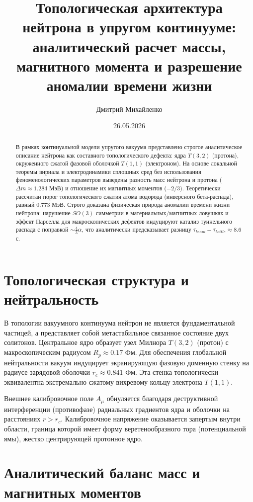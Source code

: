 \documentclass[12pt,a4paper]{article}
\title{Топологическая архитектура нейтрона в упругом континууме: аналитический расчет массы, магнитного момента и разрешение аномалии времени жизни}
\author{Дмитрий Михайленко}
\date{26.05.2026}
\begin{document}
\maketitle

\begin{abstract}
В рамках континуальной модели упругого вакуума представлено строгое аналитическое описание нейтрона как составного топологического дефекта: ядра $T(3,2)$ (протона), окруженного сжатой фазовой оболочкой $T(1,1)$ (электроном). На основе локальной теоремы вириала и электродинамики сплошных сред без использования феноменологических параметров выведены разность масс нейтрона и протона ($\Delta m \approx 1.284$ МэВ) и отношение их магнитных моментов ($-2/3$). Теоретически рассчитан порог топологического сжатия атома водорода (инверсного бета-распада), равный $0.773$ МэВ. Строго доказана физическая природа аномалии времени жизни нейтрона: нарушение $SO(3)$ симметрии в материальных/магнитных ловушках и эффект Парселла для макроскопических дефектов индуцируют катализ туннельного распада с поправкой $\sim \frac{4}{3}\alpha$, что аналитически предсказывает разницу $\tau_{beam} - \tau_{bottle} \approx 8.6$ с.
\end{abstract}

\section{Топологическая структура и нейтральность}

В топологии вакуумного континуума нейтрон не является фундаментальной частицей, а представляет собой метастабильное связанное состояние двух солитонов. Центральное ядро образует узел Милнора $T(3,2)$ (протон) с макроскопическим радиусом $R_p \approx 0.17$ Фм. Для обеспечения глобальной нейтральности вакуум индуцирует экранирующую фазовую доменную стенку на радиусе зарядовой оболочки $r_c \approx 0.841$ Фм. Эта стенка топологически эквивалентна экстремально сжатому вихревому кольцу электрона $T(1,1)$.

Внешнее калибровочное поле $A_\mu$ обнуляется благодаря деструктивной интерференции (противофазе) радиальных градиентов ядра и оболочки на расстояниях $r > r_c$. Калибровочное напряжение оказывается запертым внутри области, граница которой имеет форму веретенообразного тора (потенциальной ямы), жестко центрирующей протонное ядро.

\section{Аналитический баланс масс и магнитных моментов}
\end{document}
